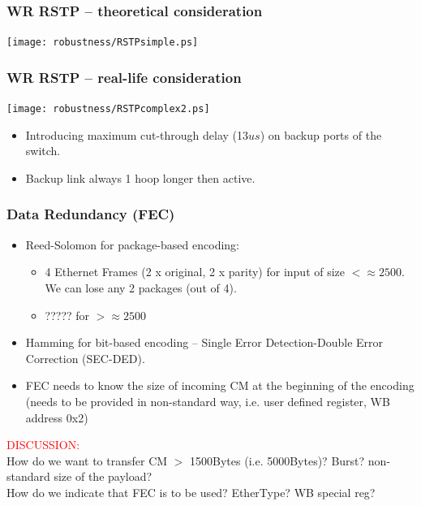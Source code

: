 \documentclass[]{beamer}
\begin{document}
\begin{frame}
  \frametitle{WR RSTP -- theoretical consideration}   

\centering
\texttt{[image: robustness/RSTPsimple.ps]}

\end{frame}
\begin{frame}
  \frametitle{WR RSTP -- real-life consideration}   

\centering
\texttt{[image: robustness/RSTPcomplex2.ps]}

  \begin{itemize}
    \item Introducing maximum cut-through delay (13$us$) on backup ports of the
          switch.
    \item Backup link always 1 hoop longer then active.
  \end{itemize}

\end{frame}
\begin{frame}
  \frametitle{Data Redundancy (FEC)}   

      \begin{itemize}
      \item Reed-Solomon for package-based encoding:
	\begin{itemize}
	\item  4 Ethernet Frames (2 x original, 2 x parity) for input of size 
	      $<\approx2500$. We can lose any 2 packages (out of 4).
	\item  ????? for $>\approx2500$
	\end{itemize}
      \item Hamming for bit-based encoding -- Single Error Detection-Double
	    Error Correction (SEC-DED).
      \item FEC needs to know the size of incoming CM at the beginning of the
	  encoding (needs to be provided in non-standard way, i.e. user defined
	  register, WB address 0x2)
      \end{itemize}

\centering
\textcolor{red}{DISCUSSION:} \\
{\small
How do we want to transfer CM $>$ 1500Bytes (i.e. 5000Bytes)? Burst?
non-standard size of the payload? \\
How do we indicate that FEC is to be used? EtherType? WB special reg? 
}
\end{frame}
\end{document}
